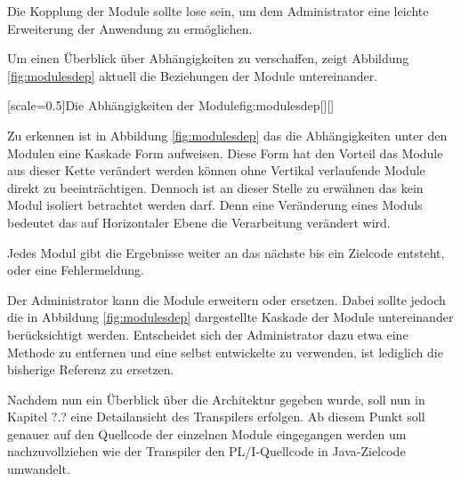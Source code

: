 Die Kopplung der Module sollte lose sein, um dem Administrator eine leichte Erweiterung der Anwendung zu ermöglichen.

Um einen Überblick über Abhängigkeiten zu verschaffen, zeigt
Abbildung \ref{fig:modulesdep} aktuell die Beziehungen der Module untereinander.

[scale=0.5]{Die Abhängigkeiten der Module}{fig:modulesdep}[][]
\pagebreak

Zu erkennen ist in Abbildung \ref{fig:modulesdep} das die Abhängigkeiten unter den Modulen eine Kaskade Form aufweisen.
Diese Form hat den Vorteil das Module aus dieser Kette verändert werden können ohne Vertikal verlaufende Module direkt zu beeinträchtigen.
Dennoch ist an dieser Stelle zu erwähnen das kein Modul isoliert betrachtet werden darf. Denn eine Veränderung eines Moduls bedeutet das auf Horizontaler 
Ebene die Verarbeitung verändert wird.

Jedes Modul gibt die Ergebnisse weiter an das nächste bis ein Zielcode entsteht, oder eine Fehlermeldung.

Der Administrator kann die Module erweitern oder ersetzen.
Dabei sollte jedoch die in Abbildung \ref{fig:modulesdep} dargestellte Kaskade der Module untereinander berücksichtigt werden.
Entscheidet sich der Administrator dazu etwa eine Methode zu entfernen und eine selbst entwickelte zu verwenden, ist lediglich die bisherige 
Referenz zu ersetzen.

Nachdem nun ein Überblick über die Architektur gegeben wurde, soll nun in Kapitel ?.? eine Detailansicht des Transpilers erfolgen.
Ab diesem Punkt soll genauer auf den Quellcode der einzelnen Module eingegangen werden um nachzuvollziehen wie der Transpiler den PL/I-Quellcode
in Java-Zielcode umwandelt.


